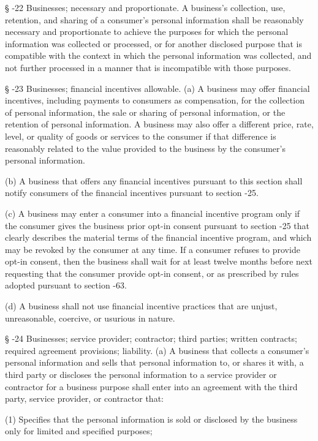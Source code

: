      §   -22  Businesses; necessary and proportionate.  A business's collection, use, retention, and sharing of a consumer's personal information shall be reasonably necessary and proportionate to achieve the purposes for which the personal information was collected or processed, or for another disclosed purpose that is compatible with the context in which the personal information was collected, and not further processed in a manner that is incompatible with those purposes.

     §   -23  Businesses; financial incentives allowable.  (a)  A business may offer financial incentives, including payments to consumers as compensation, for the collection of personal information, the sale or sharing of personal information, or the retention of personal information.  A business may also offer a different price, rate, level, or quality of goods or services to the consumer if that difference is reasonably related to the value provided to the business by the consumer's personal information.

     (b)  A business that offers any financial incentives pursuant to this section shall notify consumers of the financial incentives pursuant to section    -25.

     (c)  A business may enter a consumer into a financial incentive program only if the consumer gives the business prior opt-in consent pursuant to section    -25 that clearly describes the material terms of the financial incentive program, and which may be revoked by the consumer at any time.  If a consumer refuses to provide opt-in consent, then the business shall wait for at least twelve months before next requesting that the consumer provide opt-in consent, or as prescribed by rules adopted pursuant to section    -63.

     (d)  A business shall not use financial incentive practices that are unjust, unreasonable, coercive, or usurious in nature.

     §   -24  Businesses; service provider; contractor; third parties; written contracts; required agreement provisions; liability.  (a)  A business that collects a consumer's personal information and sells that personal information to, or shares it with, a third party or discloses the personal information to a service provider or contractor for a business purpose shall enter into an agreement with the third party, service provider, or contractor that:

     (1)  Specifies that the personal information is sold or disclosed by the business only for limited and specified purposes;

